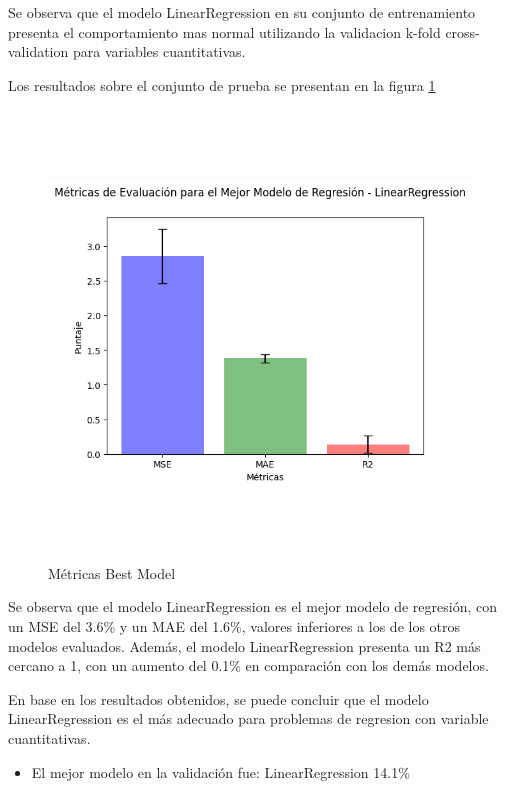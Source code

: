 Se observa que el modelo LinearRegression en su conjunto de entrenamiento presenta el comportamiento mas normal utilizando la validacion k-fold cross-validation para variables cuantitativas.

Los resultados sobre el conjunto de prueba se presentan en la figura \ref{fig:metricas_regresion_bestModel}

\begin{figure}[H]
    \centering
    \includegraphics[width=7.06111in,height=4.68611in]{img/compara_algoritmos/metricasBestModelLinearRegression.png}
    \caption{Métricas Best Model}
    \label{fig:metricas_regresion_bestModel}
\end{figure}

Se observa que el modelo LinearRegression es el mejor modelo de regresión, con un MSE del 3.6\% y un MAE del 1.6\%, valores inferiores a los de los otros modelos evaluados. Además, el modelo LinearRegression presenta un R2 más cercano a 1, con un aumento del 0.1\% en comparación con los demás modelos.

En base en los resultados obtenidos, se puede concluir que el modelo LinearRegression es el más adecuado para problemas de regresion con variable cuantitativas.

\begin{itemize}
    \item El mejor modelo en la validación fue: LinearRegression 14.1\%
\end{itemize}

